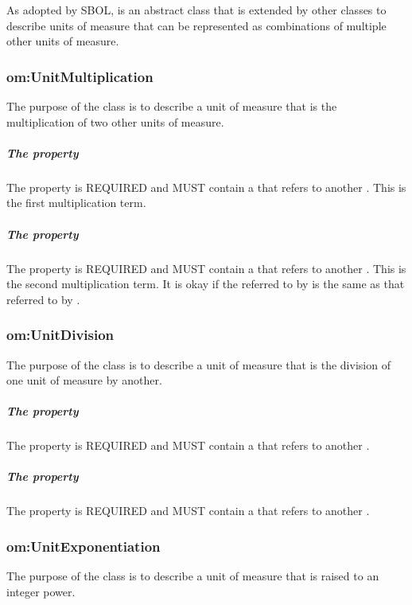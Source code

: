 As adopted by SBOL,  is an abstract class that is extended by other classes to describe units of measure that can be represented as combinations of multiple other units of measure.

\subsubsection{om:UnitMultiplication}
\label{sec:om:UnitMultiplication}

The purpose of the  class is to describe a unit of measure that is the multiplication of two other units of measure.

\subparagraph{The  property}\label{sec:om:hasTerm1}
The  property is REQUIRED and MUST contain a  that refers to another . This  is the first multiplication term.

\subparagraph{The  property}\label{sec:om:hasTerm2}
The  property is REQUIRED and MUST contain a  that refers to another . This  is the second multiplication term. It is okay if the  referred to by  is the same as that referred to by .

\subsubsection{om:UnitDivision}
\label{sec:om:UnitDivision}

The purpose of the  class is to describe a unit of measure that is the division of one unit of measure by another.

\subparagraph{The  property}\label{sec:om:hasNumerator}
The  property is REQUIRED and MUST contain a  that refers to another .

\subparagraph{The  property}\label{sec:om:hasDenominator}
The  property is REQUIRED and MUST contain a  that refers to another .

\subsubsection{om:UnitExponentiation}
\label{sec:om:UnitExponentiation}

The purpose of the  class is to describe a unit of measure that is raised to an integer power.

